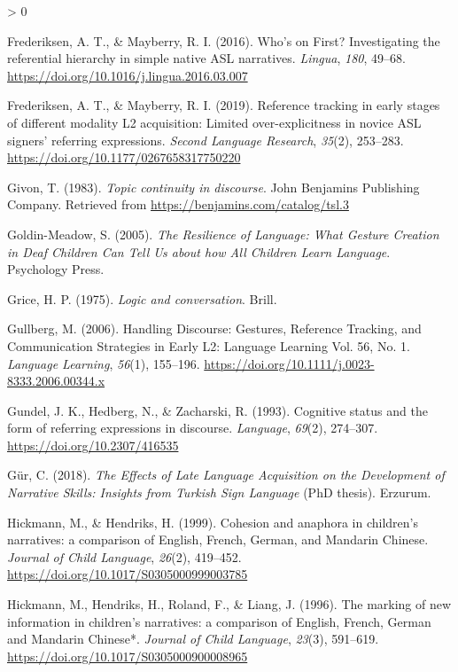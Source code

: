 \documentclass[
  english,
  doc,mask]{apa6}
\newlength{\cslhangindent}
\newenvironment{CSLReferences}[2] %
 {%
  \setlength{\parindent}{0pt}
  \ifodd #1 \everypar{\setlength{\hangindent}{\cslhangindent}}\ignorespaces\fi
  \ifnum #2 > 0
  \setlength{\parskip}{#2\baselineskip}
  \fi
 }%
 {}
\begin{document}
\begin{CSLReferences}{1}{0}
\leavevmode\hypertarget{ref-frederiksen2016}{}%
Frederiksen, A. T., \& Mayberry, R. I. (2016). Who's on First? Investigating the referential hierarchy in simple native ASL narratives. \emph{Lingua}, \emph{180}, 49--68. \url{https://doi.org/10.1016/j.lingua.2016.03.007}

\leavevmode\hypertarget{ref-frederiksen2019}{}%
Frederiksen, A. T., \& Mayberry, R. I. (2019). Reference tracking in early stages of different modality L2 acquisition: Limited over-explicitness in novice ASL signers{'} referring expressions. \emph{Second Language Research}, \emph{35}(2), 253--283. \url{https://doi.org/10.1177/0267658317750220}

\leavevmode\hypertarget{ref-givon1983}{}%
Givon, T. (1983). \emph{Topic continuity in discourse}. John Benjamins Publishing Company. Retrieved from \url{https://benjamins.com/catalog/tsl.3}

\leavevmode\hypertarget{ref-goldin-meadow2005}{}%
Goldin-Meadow, S. (2005). \emph{The Resilience of Language: What Gesture Creation in Deaf Children Can Tell Us about how All Children Learn Language}. Psychology Press.

\leavevmode\hypertarget{ref-grice1975}{}%
Grice, H. P. (1975). \emph{Logic and conversation}. Brill.

\leavevmode\hypertarget{ref-gullberg2006}{}%
Gullberg, M. (2006). Handling Discourse: Gestures, Reference Tracking, and Communication Strategies in Early L2: Language Learning Vol. 56, No. 1. \emph{Language Learning}, \emph{56}(1), 155--196. \url{https://doi.org/10.1111/j.0023-8333.2006.00344.x}

\leavevmode\hypertarget{ref-gundel1993}{}%
Gundel, J. K., Hedberg, N., \& Zacharski, R. (1993). Cognitive status and the form of referring expressions in discourse. \emph{Language}, \emph{69}(2), 274--307. \url{https://doi.org/10.2307/416535}

\leavevmode\hypertarget{ref-guxfcr2018}{}%
Gür, C. (2018). \emph{The Effects of Late Language Acquisition on the Development of Narrative Skills: Insights from Turkish Sign Language} (PhD thesis). Erzurum.

\leavevmode\hypertarget{ref-hickmann1999}{}%
Hickmann, M., \& Hendriks, H. (1999). Cohesion and anaphora in children's narratives: a comparison of English, French, German, and Mandarin Chinese. \emph{Journal of Child Language}, \emph{26}(2), 419--452. \url{https://doi.org/10.1017/S0305000999003785}

\leavevmode\hypertarget{ref-hickmann1996}{}%
Hickmann, M., Hendriks, H., Roland, F., \& Liang, J. (1996). The marking of new information in children's narratives: a comparison of English, French, German and Mandarin Chinese*. \emph{Journal of Child Language}, \emph{23}(3), 591--619. \url{https://doi.org/10.1017/S0305000900008965}


\end{CSLReferences}
\end{document}
